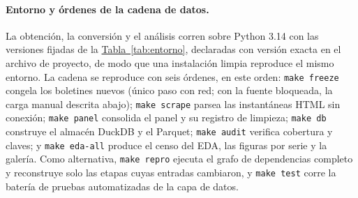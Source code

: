 \documentclass[12pt,letterpaper]{report}
\begin{document}
\paragraph{Entorno y órdenes de la cadena de datos.} La obtención, la conversión y el análisis
corren sobre Python 3.14 con las versiones fijadas de la \hyperref[tab:entorno]{Tabla~\ref*{tab:entorno}}, declaradas con
versión exacta en el archivo de proyecto, de modo que una instalación limpia reproduce el mismo
entorno. La cadena se reproduce con seis órdenes, en este orden: \texttt{make freeze} congela los
boletines nuevos (único paso con red; con la fuente bloqueada, la carga manual descrita abajo); \texttt{make scrape} parsea las instantáneas HTML sin
conexión; \texttt{make panel} consolida el panel y su registro de limpieza; \texttt{make db}
construye el almacén DuckDB y el Parquet; \texttt{make audit} verifica cobertura y claves; y
\texttt{make eda-all} produce el censo del EDA, las figuras por serie y la galería. Como
alternativa, \texttt{make repro} ejecuta el grafo de dependencias completo y reconstruye solo las
etapas cuyas entradas cambiaron, y \texttt{make test} corre la batería de pruebas automatizadas de
la capa de datos.
\end{document}
